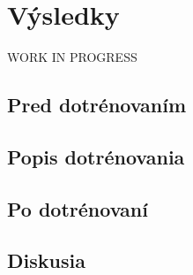 \section{Výsledky}
WORK IN PROGRESS

\subsection{Pred dotrénovaním}

\subsection{Popis dotrénovania}

\subsection{Po dotrénovaní}

\subsection{Diskusia}
